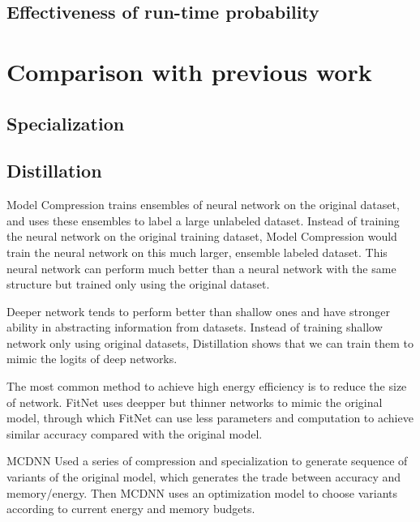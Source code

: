 \documentclass{article}
\begin{document}
\subsection{Effectiveness of run-time probability}

\section{Comparison with previous work}
\subsection{Specialization}


\subsection{Distillation}
Model Compression \cite{bucilu2006model} trains ensembles of neural network on the original dataset, and uses these ensembles to label a large unlabeled dataset. Instead of training the neural network on the original training dataset, Model Compression would train the neural network on this much larger, ensemble labeled dataset. This neural network can perform much better than a neural network with the same structure but trained only using the original dataset.

Deeper network tends to perform better than shallow ones and have stronger ability in abstracting information from datasets. Instead of training shallow network only using original datasets, Distillation \cite{hinton2015distilling} shows that we can train them to mimic the logits of deep networks.

The most common method to achieve high energy efficiency is to reduce the size of network. FitNet \cite{romero2014fitnets} uses deepper but thinner networks to mimic the original model, through which FitNet can use less parameters and computation to achieve similar accuracy compared with the original model.

MCDNN \cite{han2016mcdnn} Used a series of compression and specialization to generate sequence of variants of the original model, which generates the trade between accuracy and memory/energy. Then MCDNN uses an optimization model to choose variants according to current energy and memory budgets.
\end{document}
